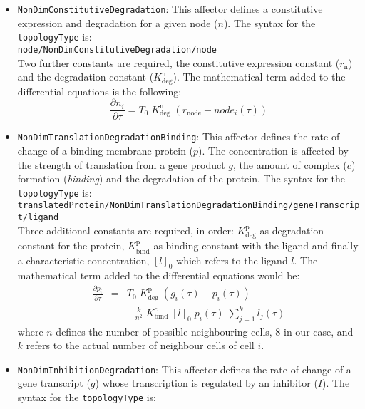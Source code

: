 \documentclass[a4paper, 11pt]{article}
\begin{document}
\begin{itemize}
\item \texttt{NonDimConstitutiveDegradation}:
  This affector defines a constitutive expression and degradation for a given node ($n$).
  The syntax for the \texttt{topologyType} is:\\[1.5ex]
  \texttt{node/NonDimConstitutiveDegradation/node}\\[1.5ex]
  Two further constants are required, the constitutive expression constant ($r_{\mathrm{n}}$) and the degradation constant ($K_{\mathrm{deg}}^{\mathrm{n}}$).
  The mathematical term added to the differential equations is the following:
  \begin{equation}
    \frac{\partial n_i}{\partial \tau} = T_0\;K_{\mathrm{deg}}^{\mathrm{n}}\;\left(r_{\mathrm{node}}-node_{i}(\tau)\right)
  \end{equation}
\item \texttt{NonDimTranslationDegradationBinding}:
  This affector defines the rate of change of a binding membrane protein ($p$).
  The concentration is affected by the strength of translation from a gene product $g$, the amount of complex ($c$) formation (\emph{binding}) and the degradation of the protein.
  The syntax for the \texttt{topologyType} is:\\[1.5ex]
  \texttt{translatedProtein/NonDimTranslationDegradationBinding/geneTranscript/ligand}\\[1.5ex]
  Three additional constants are required, in order:
  $K_{\mathrm{deg}}^{\mathrm{p}}$ as degradation constant for the protein, $K_{\mathrm{bind}}^{\mathrm{p}}$ as binding constant with the ligand and finally a characteristic concentration, $[l]_0$ which refers to the ligand $l$.
  The mathematical term added to the differential equations would be:
  \begin{eqnarray}
    \frac{\partial p_i}{\partial\tau} \nonumber & = & T_0\;K_{\mathrm{deg}}^{\mathrm{p}}\;\left(g_{i}(\tau)-p_{i}(\tau)\right) \\
    &  & -\frac{k}{n^2}\;K_{\mathrm{bind}}^{\mathrm{c}}\;[l]_0\;p_{i}(\tau)\;\sum_{j=1}^{k}l_{j}(\tau) 
  \end{eqnarray}
  where $n$ defines the number of possible neighbouring cells, 8 in our case, and $k$ refers to the actual number of neighbour cells of cell $i$.
\item \texttt{NonDimInhibitionDegradation}:
  This affector defines the rate of change of a gene transcript ($g$) whose transcription is regulated by an inhibitor ($I$).
  The syntax for the \texttt{topologyType} is:\\[1.5ex]

\end{itemize}
\end{document}
